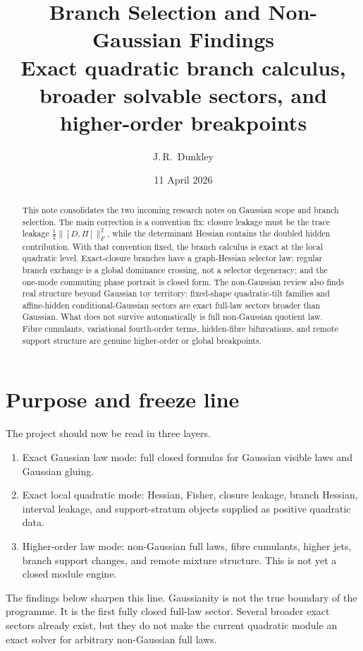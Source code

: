 \documentclass[11pt,a4paper]{article}
\title{\textbf{Branch Selection and Non-Gaussian Findings}\\
\large{Exact quadratic branch calculus, broader solvable sectors, and higher-order breakpoints}}
\author{J.\,R.~Dunkley}
\date{11 April 2026}
\numberwithin{equation}{section}
\theoremstyle{thmcompact}
\theoremstyle{remark}
\begin{document}
\maketitle

\begin{abstract}
This note consolidates the two incoming research notes on Gaussian scope and branch selection. The main correction is a convention fix: closure leakage must be the trace leakage $\frac12\|[D,\Pi]\|_F^2$, while the determinant Hessian contains the doubled hidden contribution. With that convention fixed, the branch calculus is exact at the local quadratic level. Exact-closure branches have a graph-Hessian selector law; regular branch exchange is a global dominance crossing, not a selector degeneracy; and the one-mode commuting phase portrait is closed form. The non-Gaussian review also finds real structure beyond Gaussian toy territory: fixed-shape quadratic-tilt families and affine-hidden conditional-Gaussian sectors are exact full-law sectors broader than Gaussian. What does not survive automatically is full non-Gaussian quotient law. Fibre cumulants, variational fourth-order terms, hidden-fibre bifurcations, and remote support structure are genuine higher-order or global breakpoints.
\end{abstract}

\section{Purpose and freeze line}

The project should now be read in three layers.

\begin{enumerate}
\item Exact Gaussian law mode: full closed formulas for Gaussian visible laws and Gaussian gluing.
\item Exact local quadratic mode: Hessian, Fisher, closure leakage, branch Hessian, interval leakage, and support-stratum objects supplied as positive quadratic data.
\item Higher-order law mode: non-Gaussian full laws, fibre cumulants, higher jets, branch support changes, and remote mixture structure. This is not yet a closed module engine.
\end{enumerate}

The findings below sharpen this line. Gaussianity is not the true boundary of the programme. It is the first fully closed full-law sector. Several broader exact sectors already exist, but they do not make the current quadratic module an exact solver for arbitrary non-Gaussian full laws.
\end{document}
